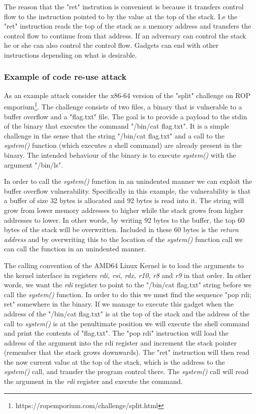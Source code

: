 The reason that the "ret" instrution is convenient is because it transfers control flow
to the instruction pointed to by the value at the top of the stack. I.e the "ret" instruction
reads the top of the stack as a memory address and transfers the control flow to continue
from that address. If an adversary can control the stack he or she can also control the
control flow. Gadgets can end with other instructions depending on what is desirable.

\subsubsection{Example of code re-use attack}

As an example attack consider the x86-64 version of the "split" challenge on ROP emporium\footnote{https://ropemporium.com/challenge/split.html}.
The challenge consists of two files, a binary that is vulnerable to a buffer overflow and
a "flag.txt" file. The goal is to provide a payload to the stdin of the binary that executes
the command "/bin/cat flag.txt". It is a simple challenge in the sense that the string
"/bin/cat flag.txt" and a call to the \textit{system()} function (which executes a shell
command) are already present in the binary. The intended behaviour of the binary is to
execute \textit{system()} with the argument "/bin/ls".

In order to call the \textit{system()} function in an unindented manner we can exploit
the buffer overflow vulnerability. Specifically in this example, the vulnerability is that
a buffer of size 32 bytes is allocated and 92 bytes is read into it. The string will grow
from lower memory addresses to higher while the stack grows from higher addresses to
lower. In other words, by writing 92 bytes to the buffer, the top 60 bytes of the stack
will be overwritten. Included in these 60 bytes is the \textit{return address} and by
overwriting this to the location of the \textit{system()} function call we can call the
function in an unindented manner.

The calling convention of the AMD64 Linux Kernel is to load the arguments to the kernel
interface in registers \textit{rdi, rsi, rdx, r10, r8} and \textit{r9} in that order\cite{system-v-abi}.
In other words, we want the \textit{rdi} register to point to the "/bin/cat flag.txt" string
before we call the \textit{system()} function. In order to do this we must find the sequence
"pop rdi; ret" somewhere in the binary. If we manage to execute this gadget when the
address of the "/bin/cat flag.txt" is at the top of the stack and the address of the call to
\textit{system()} is at the penultimate position we will execute the shell command and print
the contents of "flag.txt". The "pop rdi" instruction will load the address of the argument
into the rdi register and increment the stack pointer (remember that the stack grows
downwards). The "ret" instruction will then read the now current value at the top of the
stack, which is the address to the \textit{system()} call, and transfer the program
control there. The \textit{system()} call will read the argument in the \textit{rdi}
register and execute the command.

